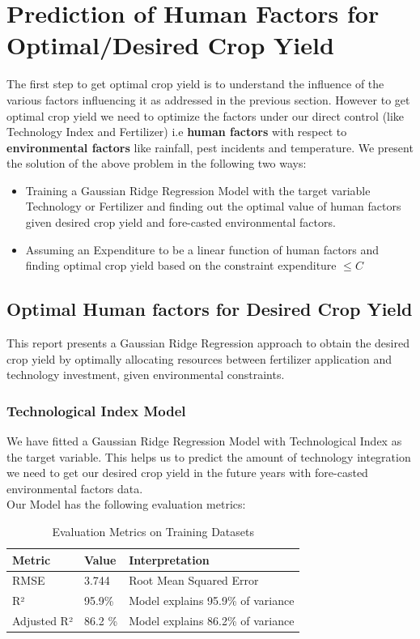 \section{Prediction of Human Factors for Optimal/Desired Crop Yield}

The first step to get optimal crop yield is to understand the influence of the various factors influencing it as addressed in the previous section. However to get optimal crop yield we need to optimize the factors under our direct control (like Technology Index and Fertilizer) i.e \textbf{human factors} with respect to \textbf{environmental factors} like rainfall, pest incidents and temperature. We present the solution of the above problem in the following two ways:

\begin{itemize}
    \item Training a Gaussian Ridge Regression Model with the target variable Technology or Fertilizer and finding out the optimal value of human factors given desired crop yield and fore-casted environmental factors.
    \item Assuming an Expenditure to be a linear function of human factors and finding optimal crop yield based on the constraint expenditure $\leq C$
\end{itemize}

\subsection{Optimal Human factors for Desired Crop Yield}

This report presents a Gaussian Ridge Regression approach to obtain the desired crop yield by optimally allocating resources between fertilizer application and technology investment, given environmental constraints.

\subsubsection{Technological Index Model}

We have fitted a Gaussian Ridge Regression Model with Technological Index as the target variable. This helps us to predict the amount of technology integration we need to get our desired crop yield in the future years with fore-casted environmental factors data. \\

\noindent Our Model has the following evaluation metrics:

\begin{table}[h]
\centering
\caption{Evaluation Metrics on Training Datasets}
\begin{tabular}{lll}
\toprule
\textbf{Metric} & \textbf{Value} & \textbf{Interpretation} \\
\midrule
RMSE & 3.744 & Root Mean Squared Error \\
R² & 95.9\% & Model explains 95.9\% of variance\\
Adjusted R² & 86.2 \%  & Model explains 86.2\% of variance\\
\bottomrule
\end{tabular}
\end{table}

